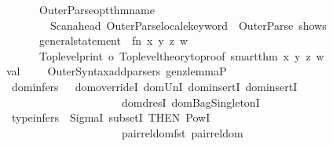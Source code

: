 \begin{isabellebody}
\ \ \ \ \ \ {\isacharparenleft}OuterParse{\isachardot}opt{\isacharunderscore}thm{\isacharunderscore}name\ {\isachardoublequote}{\isacharcolon}{\isachardoublequote}\ {\isacharminus}{\isacharminus}{\isacharbar}\isanewline
\ \ \ \ \ \ \ \ Scan{\isachardot}ahead\ {\isacharparenleft}OuterParse{\isachardot}locale{\isacharunderscore}keyword\ {\isacharbar}{\isacharbar}\ OuterParse{\isachardot}{\isachardollar}{\isachardollar}{\isachardollar}\ {\isachardoublequote}shows{\isachardoublequote}{\isacharparenright}{\isacharparenright}\ \isanewline
\ \ \ \ \ \ \ \ \ \ {\isacharparenleft}{\isachardoublequote}{\isachardoublequote}{\isacharcomma}\ {\isacharbrackleft}{\isacharbrackright}{\isacharparenright}\ {\isacharminus}{\isacharminus}\isanewline
\ \ \ \ \ \ general{\isacharunderscore}statement\ {\isachargreater}{\isachargreater}\ {\isacharparenleft}fn\ {\isacharparenleft}{\isacharparenleft}x{\isacharcomma}\ y{\isacharparenright}{\isacharcomma}\ {\isacharparenleft}z{\isacharcomma}\ w{\isacharparenright}{\isacharparenright}\ {\isacharequal}{\isachargreater}\isanewline
\ \ \ \ \ \ {\isacharparenleft}Toplevel{\isachardot}print\ o\ Toplevel{\isachardot}theory{\isacharunderscore}to{\isacharunderscore}proof\ {\isacharparenleft}smart{\isacharunderscore}thm\ x\ y\ z\ w{\isacharparenright}{\isacharparenright}{\isacharparenright}{\isacharparenright}{\isacharsemicolon}\isanewline
\isanewline
\isanewline
val\ {\isacharunderscore}\ {\isacharequal}\ \ \ OuterSyntax{\isachardot}add{\isacharunderscore}parsers\ {\isacharbrackleft}gen{\isacharunderscore}zlemmaP{\isacharbrackright}{\isacharsemicolon}\isanewline
\isanewline
\isanewline
{\isacharverbatimclose}%
\endisatagML
{\isafoldML}%
%
\isadelimML
%
\endisadelimML
%
\isamarkuptrue%
\isamarkupfalse%
\ dom{\isacharunderscore}infers\ \ {\isacharequal}\ dom{\isacharunderscore}override{\isacharunderscore}I\ dom{\isacharunderscore}Un{\isacharunderscore}I\ dom{\isacharunderscore}insert{\isacharunderscore}I{}\ dom{\isacharunderscore}insert{\isacharunderscore}I{}\isanewline
\ \ \ \ \ \ \ \ \ \ \ \ \ \ \ \ \ \ \ \ \ dom{\isacharunderscore}dres{\isacharunderscore}I\ dom{\isacharunderscore}BagSingleton{\isacharunderscore}I\isanewline
\isanewline
{}\isamarkupfalse%
\ type{\isacharunderscore}infers\ {\isacharequal}\ SigmaI\ subsetI\ {\isacharbrackleft}THEN\ PowI{\isacharbrackright}\isanewline
\ \ \ \ \ \ \ \ \ \ \ \ \ \ \ \ \ \ \ \ \ pair{\isacharunderscore}rel{\isacharunderscore}dom{\isacharunderscore}fst\ pair{\isacharunderscore}rel{\isacharunderscore}dom\isanewline

\end{isabellebody}
